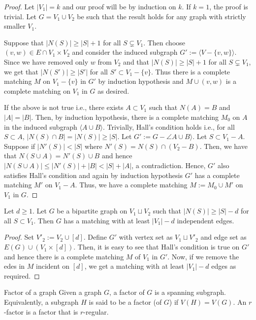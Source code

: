 \documentclass[../basic_graph_theory.tex]{subfiles}
\begin{document}
\begin{proof}
    Let $|V_1| = k$ and our proof will be by induction on $k$. If $k = 1$, the proof is trivial. Let $G = V_1 \cup V_2$ be such that the result holds for any graph with strictly smaller $V_1$.
    
    Suppose that $|N(S)| \geq |S| + 1$ for all $S \subsetneq V_1$. Then choose $(v,w) \in E \cap V_1 \times V_2$ and consider the induced subgraph $G' := \langle V - \{v,w\} \rangle$. Since we have removed only $w$ from $V_2$ and that $|N(S)| \geq |S| + 1$ for all $S \subsetneq V_1$, we get that $|N(S')| \geq |S'|$ for all $S' \subset V_1 - \{v\}$. Thus there is a complete matching $M$ on $V_1 - \{v\}$ in $G'$ by induction hypothesis and $M \cup (v,w)$ is a complete matching on $V_1$ in $G$ as desired.

    If the above is not true i.e., there exists $A \subset V_1$ such that $N(A) = B$ and $|A| = |B|$. Then, by induction hypothesis, there is a complete matching $M_0$ on $A$ in the induced subgraph $\langle A \cup B \rangle$. Trivially,  Hall's condition holds i.e., for all $S \subset A$,  $|N(S) \cap B| =  |N(S)| \geq |S|$. Let $G' := G - \angle  A \cup B \rangle$.  Let $S \subset V_1 - A$.  Suppose if $|N'(S)| < |S|$ where $N'(S) = N(S) \cap (V_2 - B)$.  Then,  we have that $N(S \cup A) = N'(S) \cup B$ and hence $|N(S \cup A)| \leq |N'(S)| + |B| < |S| + |A|$,  a contradiction.  Hence, $G'$ also satisfies Hall's condition and again by induction hypothesis $G'$ has a complete matching $M'$ on $V_1 -A$. Thus, we have a complete matching $M := M_0 \cup M'$ on $V_1$ in $G$.
\end{proof}

\begin{prop}
    Let $d \geq 1$. Let $G$ be a bipartite graph on $V_1 \sqcup V_2$ such that $|N(S)| \geq |S| - d$ for all $S \subset V_1$. Then $G$ has a matching with at least $|V_1| - d$ independent edges.
\end{prop}

\begin{proof}
    Set $V'_2 := V_2 \cup [d]$. Define $G'$ with vertex set as $V_1 \sqcup V'_2$ and edge set as $E(G) \cup (V_1 \times [d])$. Then, it is easy to see that Hall's condition is true on $G'$ and hence there is a complete matching $M$ of $V_1$ in $G'$. Now, if we remove the edes in $M$ incident on $[d]$, we get a matching with at least $|V_1| - d$ edges as required.
\end{proof}

\begin{Def}{Factor of a graph }{}
    Given a graph $G$,  a factor of $G$ is a spanning subgraph.  Equivalently,  a subgraph $H$ is said to be a factor (of $G$) if $V(H) = V(G)$. An $r$-factor is a factor that is $r$-regular.
\end{Def}
\end{document}
